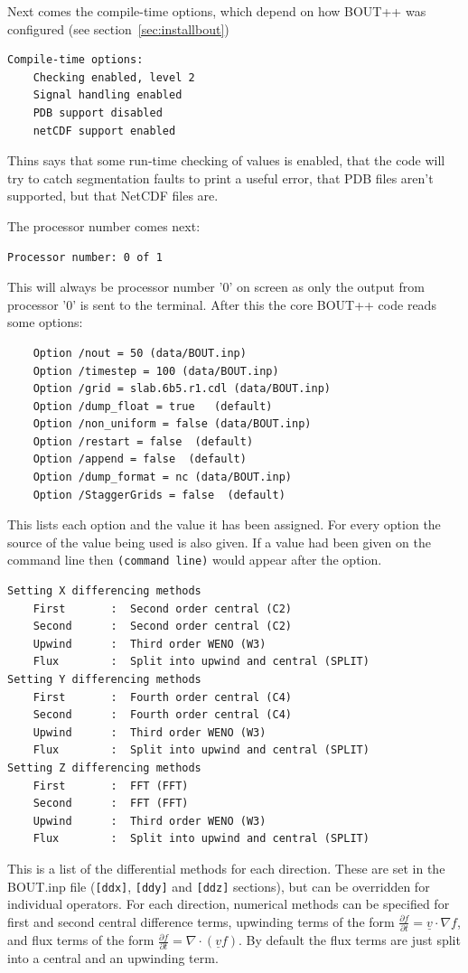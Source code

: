 \documentclass[12pt]{article}
\newcommand{\code}[1]{\texttt{#1}}
\newcommand{\deriv}[2]{\ensuremath{\frac{\partial #1}{\partial #2}}}
\begin{document}
Next comes the compile-time options, which depend on how BOUT++ was configured
(see section~\ref{sec:installbout})
%
\begin{verbatim}
Compile-time options:
	Checking enabled, level 2
	Signal handling enabled
	PDB support disabled
	netCDF support enabled
\end{verbatim}
%
Thins says that some run-time checking of values is enabled, that the code will
try to catch segmentation faults to print a useful error, that PDB files aren't
supported, but that NetCDF files are.

The processor number comes next:
%
\begin{verbatim}
Processor number: 0 of 1
\end{verbatim}
%
This will always be processor number '0' on screen as only the output from
processor '0' is sent to the terminal. After this the core BOUT++ code reads
some options:
%
\begin{verbatim}
	Option /nout = 50 (data/BOUT.inp)
	Option /timestep = 100 (data/BOUT.inp)
	Option /grid = slab.6b5.r1.cdl (data/BOUT.inp)
	Option /dump_float = true   (default)
	Option /non_uniform = false (data/BOUT.inp)
	Option /restart = false  (default)
	Option /append = false  (default)
	Option /dump_format = nc (data/BOUT.inp)
	Option /StaggerGrids = false  (default)
\end{verbatim}
%
This lists each option and the value it has been assigned.  For every option
the source of the value being used is also given.  If a value had been given on
the command line then \texttt{(command line)} would appear after the option.

%
\begin{verbatim}
Setting X differencing methods
	First       :  Second order central (C2)
	Second      :  Second order central (C2)
	Upwind      :  Third order WENO (W3)
	Flux        :  Split into upwind and central (SPLIT)
Setting Y differencing methods
	First       :  Fourth order central (C4)
	Second      :  Fourth order central (C4)
	Upwind      :  Third order WENO (W3)
	Flux        :  Split into upwind and central (SPLIT)
Setting Z differencing methods
	First       :  FFT (FFT)
	Second      :  FFT (FFT)
	Upwind      :  Third order WENO (W3)
	Flux        :  Split into upwind and central (SPLIT)
\end{verbatim}
%
This is a list of the differential methods for each direction. These are set in
the BOUT.inp file (\code{[ddx]}, \code{[ddy]} and \code{[ddz]} sections), but
can be overridden for individual operators. For each direction, numerical
methods can be specified for first and second central difference terms,
upwinding terms of the form $\deriv{f}{t} = \underline{v}\cdot\nabla f$, and
flux terms of the form $\deriv{f}{t} = \nabla\cdot\left(\underline{v}f\right)$.
By default the flux terms are just split into a central and an upwinding term.
\end{document}

